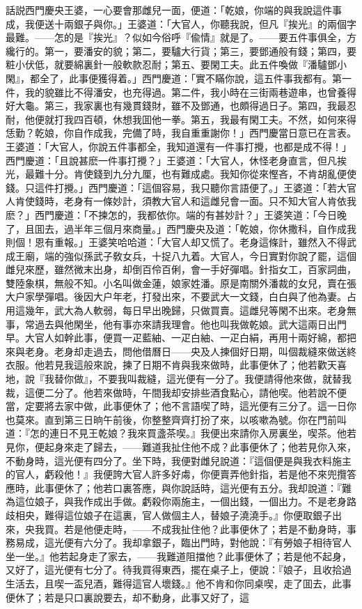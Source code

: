 話説西門慶央王婆，一心要會那雌兒一面，便道：「乾娘，你端的與我說這件事成，我便送十兩銀子與你。」王婆道：「大官人，你聽我說，但凡『挨光』的兩個字最難。——怎的是『挨光』？似如今俗呼『偸情』就是了。——要五件事俱全，方纔行的。第一，要潘安的貌；第二，要驢大行貨；第三，要鄧通般有錢；第四，要粧小伏低，就要綿裏針一般軟款忍耐；第五、要閑工夫。此五件喚做『潘驢鄧小閑』，都全了，此事便獲得着。」西門慶道：「實不瞞你說，這五件事我都有。第一件，我的貌雖比不得潘安，也充得過。第二件，我小時在三街兩巷遊串，也曾養得好大龜。第三，我家裏也有幾貫錢財，雖不及鄧通，也頗得過日子。第四，我最忍耐，他便就打我四百頓，休想我囬他一拳。第五，我最有閑工夫。不然，如何來得恁勤？乾娘，你自作成我，完備了時，我自重重謝你！」西門慶當日意已在言表。王婆道：「大官人，你說五件事都全，我知道還有一件事打攪，也都是成不得！」西門慶道：「且說甚麽一件事打攪？」王婆道：「大官人，休怪老身直言，但凡挨光，最難十分。肯使錢到九分九厘，也有難成處。我知你從來慳吝，不肯胡亂便使錢。只這件打攪。」西門慶道：「這個容易，我只聽你言語便了。」王婆道：「若大官人肯使錢時，老身有一條妙計，須教大官人和這雌兒會一面。只不知大官人肯依我麽？」西門慶道：「不揀怎的，我都依你。端的有甚妙計？」王婆笑道：「今日晚了，且囬去，過半年三個月來商量。」西門慶央及道：「乾娘，你休撒科，自作成我則個！恩有重報。」王婆笑哈哈道：「大官人却又慌了。老身這條計，雖然入不得武成王廟，端的強似孫武子敎女兵，十捉八九着。大官人，今日實對你說了罷，這個雌兒來歷，雖然微末出身，却倒百伶百俐，會一手好彈唱。針指女工，百家詞曲，雙陸象棋，無般不知。小名叫做金蓮，娘家姓潘。原是南關外潘裁的女兒，賣在張大户家學彈唱。後因大户年老，打發出來，不要武大一文錢，白白與了他為妻。占用這幾年，武大為人軟弱，每日早出晚歸，只做買賣。這雌兒等閑不出來。老身無事，常過去與他閑坐，他有事亦來請我理會。他也叫我做乾娘。武大這兩日出門早。大官人如幹此事，便買一疋藍紬、一疋白紬、一疋白絹，再用十兩好綿，都把來與老身。老身却走過去，問他借曆日——央及人揀個好日期，叫個裁縫來做送終衣服。他若見我這般來說，揀了日期不肯與我來做時，此事便休了；他若歡天喜地，說『我替你做』，不要我叫裁縫，這光便有一分了。我便請得他來做，就替我裁，這便二分了。他若來做時，午間我却安排些酒食點心，請他喫。他若說不便當，定要將去家中做，此事便休了；他不言語喫了時，這光便有三分了。這一日你也莫來。直到第三日晌午前後，你整整齊齊打扮了來，以咳嗽為號。你在門前叫道：『怎的連日不見王乾娘？我來買盞茶喫。』我便出來請你入房裏坐，喫茶。他若見你，便起身來走了歸去，——難道我扯住他不成？此事便休了；他若見你入來，不動身時，這光便有四分了。坐下時，我便對雌兒說道：『這個便是與我衣料施主的官人，虧殺他！』我便誇大官人許多好䖏，你便賣弄他針指，若是他不來兜攬答應時，此事便休了；他若口裏答應，與你說話時，這光便有五分。我却說道：『難為這位娘子，與我作成出手做。虧殺你兩施主，一個出錢，一個出力。不是老身路歧相央，難得這位娘子在這裏，官人做個主人，替娘子澆澆手。』你便取銀子出來，央我買。若是他便走時，——不成我扯住他？此事便休了；若是不動身時，事務易成，這光便有六分了。我却拿銀子，臨出門時，對他說：『有勞娘子相待官人坐一坐。』他若起身走了家去，——我難道阻擋他？此事便休了；若是他不起身，又好了，這光便有七分了。待我買得東西，擺在桌子上，便說：『娘子，且收拾過生活去，且喫一盃兒酒，難得這官人壞錢。』他不肯和你同桌喫，走了囬去，此事便休了；若是只口裏說要去，却不動身，此事又好了，這